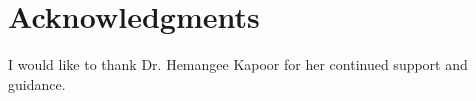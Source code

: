 
\chapter*{Acknowledgments}


I would like to thank Dr. Hemangee Kapoor for her continued support
and guidance.
